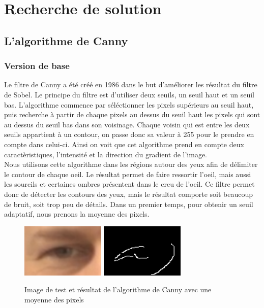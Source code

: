 \section{Recherche de solution}

\subsection{L'algorithme de Canny}

\subsubsection{Version de base}
Le filtre de Canny a été créé en 1986 dans le but d'améliorer les résultat du filtre de Sobel.
Le principe du filtre est d'utiliser deux seuils, un seuil haut et un seuil bas. L'algorithme
commence par séléctionner les pixels supérieurs au seuil haut, puis recherche à partir de chaque
pixels au dessus du seuil haut les pixels qui sont au dessus du seuil bas dans son voisinage. 
Chaque voisin qui est entre les deux seuils appartient à un contour, on passe donc sa valeur à
255 pour le prendre en compte dans celui-ci. Ainsi on voit 
que cet algorithme prend en compte deux caractèristiques, l'intensité et la direction du
gradient de l'image.\\

Nous utilisons cette algorithme dans les régions autour des yeux afin de délimiter le contour
de chaque oeil. Le résultat permet de faire ressortir l'oeil, mais aussi les sourcils et certaines
ombres présentent dans le creu de l'oeil. Ce filtre permet donc de détecter les contours des yeux,
mais le résultat comporte soit beaucoup de bruit, soit trop peu de détails. Dans un premier
temps, pour obtenir un seuil adaptatif, nous prenons la moyenne des pixels.

\begin{figure}[H]
 \center
 \includegraphics[width=4cm]{image/original.png}
 \includegraphics[width=4cm]{image/canny_moyenne.png}
 \caption{Image de test et résultat de l'algorithme de Canny avec une moyenne des pixels}
\end{figure}

